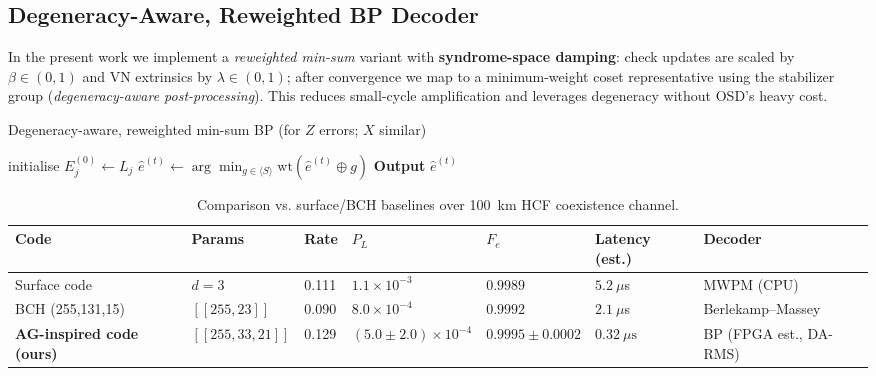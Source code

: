 \documentclass[conference]{IEEEtran}
\begin{document}
\subsection{Degeneracy-Aware, Reweighted BP Decoder}\label{sec:implementation}
In the present work we implement a \emph{reweighted min-sum} variant with \textbf{syndrome-space damping}: check updates are scaled by $\beta\!\in\!(0,1)$ and VN extrinsics by $\lambda\!\in\!(0,1)$; after convergence we map to a minimum-weight coset representative using the stabilizer group (\emph{degeneracy-aware post-processing}).
This reduces small-cycle amplification and leverages degeneracy without OSD’s heavy cost.

\begin{algorithm}[t]
\caption{Degeneracy-aware, reweighted min-sum BP (for $Z$ errors; $X$ similar)}\label{algo:dabp}
initialise $E_j^{(0)} \gets L_j$\;
$\hat e^{(t)} \leftarrow \arg\min_{g\in \langle S\rangle} \mathrm{wt}(\hat e^{(t)}\oplus g)$\;
\textbf{Output} $\hat{e}^{(t)}$ \;
\end{algorithm}

\begin{table*}[t]
\centering
\caption{Comparison vs. surface/BCH baselines over 100~km HCF coexistence channel.}
\begin{tabular}{lllllll}
\toprule
Code & Params & Rate & $P_L$ & $F_e$ & Latency (est.) & Decoder \\
\midrule
Surface code & $d=3$ & 0.111 & $1.1\times 10^{-3}$ & $0.9989$ & $5.2~\mu$s & MWPM (CPU) \\
BCH (255,131,15) & $[[255,23]]$ & 0.090 & $8.0\times 10^{-4}$ & $0.9992$ & $2.1~\mu$s & Berlekamp--Massey \\
\textbf{AG-inspired code (ours)} & $[[255,33,21]]$ & 0.129 & $(5.0\pm 2.0)\times 10^{-4}$ & $0.9995\pm 0.0002$ & $0.32~\mu\text{s}$ & BP (FPGA est., DA-RMS) \\
\bottomrule
\end{tabular}
\end{table*}
\end{document}
